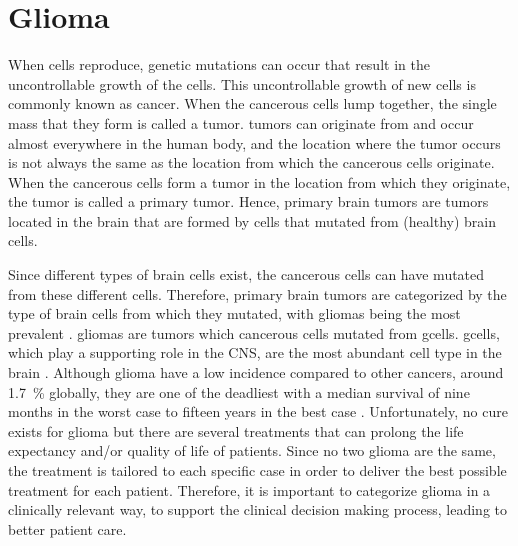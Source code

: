 \section{Glioma}

When cells reproduce, genetic mutations can occur that result in the uncontrollable growth of the cells.
This uncontrollable growth of new cells is commonly known as cancer.
When the cancerous cells lump together, the single mass that they form is called a \gls{tumor}.
\Glspl{tumor} can originate from and occur almost everywhere in the human body, and the location where the \gls{tumor} occurs is not always the same as the location from which the cancerous cells originate.
When the cancerous cells form a \gls{tumor} in the location from which they originate, the \gls{tumor} is called a primary \gls{tumor}.
Hence, primary brain \glspl{tumor} are \glspl{tumor} located in the brain that are formed by cells that mutated from (healthy) brain cells.

Since different types of brain cells exist, the cancerous cells can have mutated from these different cells.
Therefore, primary brain \glspl{tumor} are categorized by the type of brain cells from which they mutated, with \glspl{glioma} being the most prevalent \autocite{leece2017indicence}.
\Glspl{glioma} are \glspl{tumor} which cancerous cells mutated from \glspl{gcell}.
\Glspl{gcell}, which play a supporting role in the \acrlong{CNS}, are the most abundant cell type in the brain \autocite{jakel2017glial}.
Although \gls{glioma} have a low incidence compared to other cancers, around \SI{1.7}{\percent} globally, they are one of the deadliest with a median survival of nine months in the worst case to fifteen years in the best case \autocite{leece2017indicence, ho2014incidence, olar2015survival}.
Unfortunately, no cure exists for \gls{glioma} but there are several treatments that can prolong the life expectancy and/or quality of life of patients.
Since no two \gls{glioma} are the same, the treatment is tailored to each specific case in order to deliver the best possible treatment for each patient.
Therefore, it is important to categorize \gls{glioma} in a clinically relevant way, to support the clinical decision making process, leading to better patient care.

